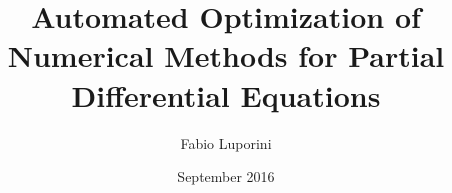 


\title{Automated Optimization of Numerical Methods for Partial Differential Equations}
\author{Fabio Luporini}
\date{September 2016}

\dedication{To Alice}



\maketitle


\begin{abstract}

\end{abstract}


\makededication


\tableofcontents
\listoftables
\listoffigures


\mainmatter






















